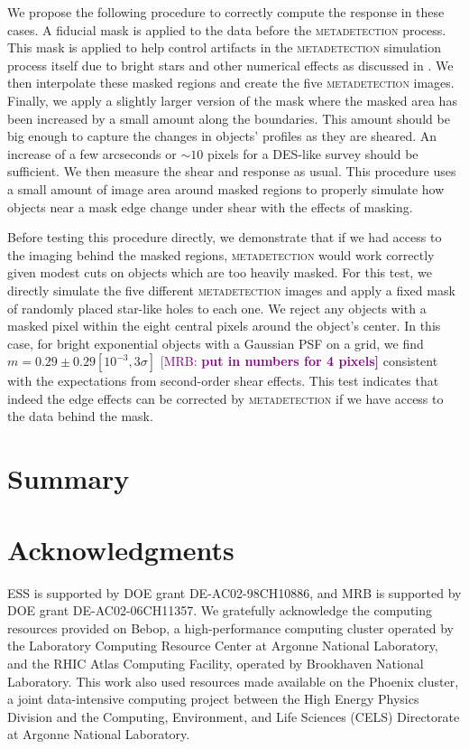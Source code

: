 \documentclass[twocolappendix, appendixfloats, numberedappendix, twocolumn, apj]{openjournal}
\newcommand{\mrb}[1]{\textcolor{purple}{[MRB: \bf #1]}\xspace}
\newcommand{\mdet}{\textsc{metadetection}\xspace}
\begin{document}
We propose the following procedure to correctly compute the response in these cases. A fiducial mask is applied to the data before
the \mdet process. This mask is applied to help control artifacts in the \mdet simulation process itself due to bright stars
and other numerical effects as discussed in \citep{sheldoninprep}. We then interpolate these masked regions and create the five
\mdet images. Finally, we apply a slightly larger version of the mask where the masked area has been increased by a small amount
along the boundaries. This amount should be big enough to capture the changes in objects' profiles as they are sheared. An
increase of a few arcseconds or $\sim10$ pixels for a DES-like survey should be sufficient. We then measure the shear and
response as usual. This procedure uses a small amount of image area around masked regions to properly simulate how objects near a
mask edge change under shear with the effects of masking.

Before testing this procedure directly, we demonstrate that if we had access to the imaging behind the masked regions, \mdet would work
correctly given modest cuts on objects which are too heavily masked. For this test, we directly simulate the five different \mdet images
and apply a fixed mask of randomly placed star-like holes to each one. We reject any objects with a masked pixel within the eight central pixels around the object's center. In this case, for bright exponential objects with a Gaussian PSF on a grid, we find $m=0.29 \pm 0.29 [10^{-3}, 3\sigma]$ \mrb{put in numbers for 4 pixels} consistent with the expectations from second-order shear effects. This test indicates that indeed the edge effects can be corrected by \mdet if we have access to the data behind the mask.


\section{Summary}\label{sec:conc}

\section*{Acknowledgments}

ESS is supported by DOE grant DE-AC02-98CH10886, and MRB is supported by DOE
grant DE-AC02-06CH11357.  We gratefully acknowledge the computing resources
provided on Bebop, a high-performance computing cluster operated by the
Laboratory Computing Resource Center at Argonne National Laboratory, and the
RHIC Atlas Computing Facility, operated by Brookhaven National Laboratory.
This work also used resources made available on the Phoenix cluster, a joint
data-intensive computing project between the High Energy Physics Division and
the Computing, Environment, and Life Sciences (CELS) Directorate at Argonne
National Laboratory.




\end{document}
